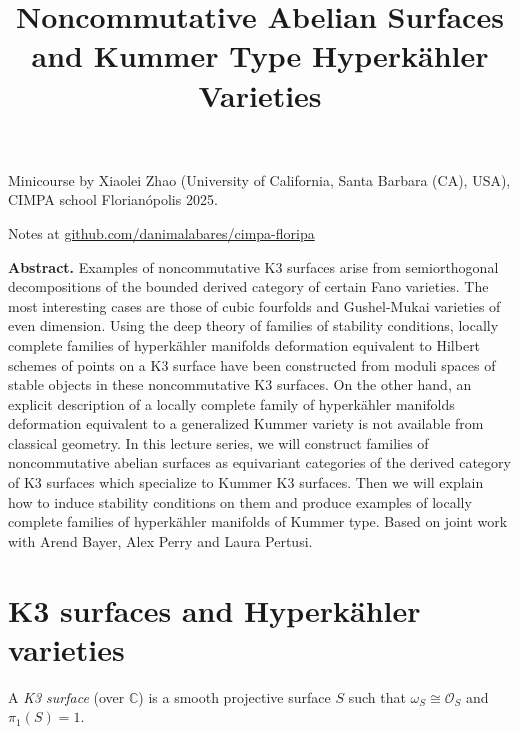 


\title{Noncommutative Abelian Surfaces and
Kummer Type Hyperk\"ahler Varieties}
\maketitle

\noindent
Minicourse by Xiaolei Zhao (University of
California, Santa Barbara (CA), USA), CIMPA
school Florian\'opolis 2025.

\medskip\noindent
Notes at
\href{%
http://github.com/danimalabares/cimpa-floripa
}{%
github.com/danimalabares/cimpa-floripa
}

\bigskip\noindent

{\bf Abstract.} Examples of noncommutative K3
surfaces arise from semiorthogonal
decompositions of the bounded derived
category of certain Fano varieties. The most
interesting cases are those of cubic
fourfolds and Gushel-Mukai varieties of even
dimension. Using the deep theory of families
of stability conditions, locally complete
families of hyperk\"ahler manifolds
deformation
equivalent to Hilbert schemes of points on a
K3 surface have been constructed from moduli
spaces of stable objects in these
noncommutative K3 surfaces. On the other
hand, an explicit description of a locally
complete family of hyperk\"ahler manifolds
deformation equivalent to a generalized
Kummer variety is not available from
classical geometry. In this lecture series,
we will construct families of noncommutative
abelian surfaces as equivariant categories of
the derived category of K3 surfaces which
specialize to Kummer K3 surfaces. Then we
will explain how to induce stability
conditions on them and produce examples of
locally complete families of hyperk\"ahler
manifolds of Kummer type. Based on joint work
with Arend Bayer, Alex Perry and Laura
Pertusi.

\bigskip\noindent
\tableofcontents
\bigskip\noindent

\noindent

\section{K3 surfaces and Hyperk\"ahler
varieties}
\label{nasak-label-001}

\begin{definition}
\label{definition-K3-surface}
A {\it K3 surface} (over $\mathbb{C}$) is a
smooth projective surface $S$ such that
$\omega_S \cong \mathcal{O}_S$ and
$\pi_1(S)=1$.
\end{definition}

